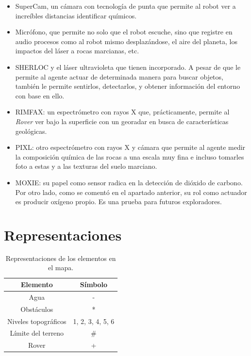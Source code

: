 \documentclass[12pt, letterpaper]{article}
\begin{document}
        \begin{itemize}

            \item SuperCam\cite{maurice2021supercam}, un cámara con tecnología de punta que permite al robot ver a increíbles distancias identificar químicos.
            \item Micrófono, que permite no solo que el robot escuche, sino que registre en audio procesos como al robot mismo desplazándose, el aire del planeta, los impactos del láser a rocas marcianas, etc.\cite{leighton2021thoughts}
            \item SHERLOC\cite{beegle2016sherloc} y el láser ultravioleta que tienen incorporado. A pesar de que le permite al agente actuar de determinada manera para buscar objetos, también le permite sentirlos, detectarlos, y obtener información del entorno con base en ello.
            \item RIMFAX\cite{hamran2015rimfax}: un espectrómetro con rayos X que, prácticamente, permite al \textit{Rover} ver bajo la superficie con un georadar en busca de características geológicas.
            \item PIXL\cite{allwood2021pixl}: otro espectrómetro con rayos X y cámara que permite al agente medir la composición química de las rocas a una escala muy fina e incluso tomarles foto a estas y a las texturas del suelo marciano.
            \item MOXIE:\cite{hoffman2022mars} su papel como sensor radica en la detección de dióxido de carbono. Por otro lado, como se comentó en el apartado anterior, su rol como actuador es producir oxígeno propio. Es una prueba para futuros exploradores.
        \end{itemize}

\section{Representaciones}

    \begin{table}[h!]
        \centering
        \begin{tabular}{|c|c|} %
            \hline %
            \textbf{Elemento} & \textbf{Símbolo} \\
            \hline %
            Agua & -\\
            \hline %
            Obstáculos & * \\
            \hline %
            Niveles topográficos & 1, 2, 3, 4, 5, 6 \\
            \hline %
            Límite del terreno & \# \\
            \hline %
            Rover & + \\
            \hline %
        \end{tabular}
        \caption{Representaciones de los elementos en el mapa.}\label{tabla:representaciones}
    \end{table}
\end{document}
